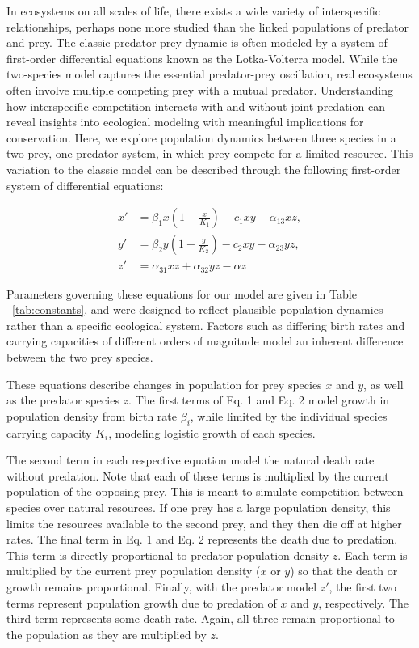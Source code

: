 In ecosystems on all scales of life, there exists a wide variety of interspecific relationships, perhaps none more studied than the linked populations of predator and prey. The classic predator-prey dynamic is often modeled by a system of first-order differential equations known as the Lotka-Volterra model.
While the two-species model captures the essential predator-prey oscillation, real ecosystems often involve multiple competing prey with a mutual predator. Understanding how interspecific competition interacts with and without joint predation can reveal insights into ecological modeling with meaningful implications for conservation.
Here, we explore population dynamics between three species in a two-prey, one-predator system, in which prey compete for a limited resource. This variation to the classic model can be described through the following first-order system of differential equations:

\begin{align}
    x' &= \beta_1 x\left(1 - \frac{x}{K_1}\right) - c_1 xy - \alpha_{13} xz, \\
    y' &= \beta_2 y\left(1 - \frac{y}{K_2}\right) - c_2 xy - \alpha_{23} yz, \\
    z' &= \alpha_{31} xz + \alpha_{32} yz - \alpha z
\end{align}

Parameters governing these equations for our model are given in Table ~\ref{tab:constants}, and were designed to reflect plausible population dynamics rather than a specific ecological system. Factors such as differing birth rates and carrying capacities of different orders of magnitude model an inherent difference between the two prey species.

These equations describe changes in population for prey species $x$ and $y$, as well as the predator species $z$. The first terms of Eq. 1 and Eq. 2 model growth in population density from birth rate $\beta_i$, while limited by the individual species carrying capacity $K_i$, modeling logistic growth of each species.

The second term in each respective equation model the natural death rate without predation. Note that each of these terms is multiplied by the current population of the opposing prey. This is meant to simulate competition between species over natural resources. If one prey has a large population density, this limits the resources available to the second prey, and they then die off at higher rates. The final term in Eq. 1 and Eq. 2 represents the death due to predation. This term is directly proportional to predator population density $z$. Each term is multiplied by the current prey population density ($x$ or $y$) so that the death or growth remains proportional. Finally, with the predator model $z'$, the first two terms represent population growth due to predation of $x$ and $y$, respectively. The third term represents some death rate. Again, all three remain proportional to the population as they are multiplied by $z$. 

